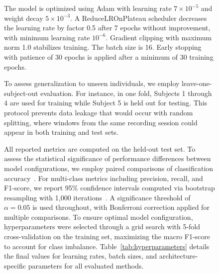 \documentclass[pdflatex,sn-vancouver-num, iicol]{sn-jnl}
\begin{document}
\begin{figure}[h]
The model is optimized using Adam with learning rate $7 \times 10^{-5}$ and weight decay $5 \times 10^{-3}$. A ReduceLROnPlateau scheduler decreases the learning rate by factor 0.5 after 7 epochs without improvement, with minimum learning rate $10^{-6}$. Gradient clipping with maximum norm 1.0 stabilizes training. The batch size is 16. Early stopping with patience of 30 epochs is applied after a minimum of 30 training epochs.


To assess generalization to unseen individuals, we employ leave-one-subject-out evaluation. For instance, in one fold, Subjects 1 through 4 are used for training while Subject 5 is held out for testing. This protocol prevents data leakage that would occur with random splitting, where windows from the same recording session could appear in both training and test sets.

All reported metrics are computed on the held-out test set. To assess the statistical significance of performance differences between model configurations, we employ paired comparisons of classification accuracy~\cite{demsar2006statistical}. For multi-class metrics including precision, recall, and F1-score, we report 95\% confidence intervals computed via bootstrap resampling with 1,000 iterations~\cite{lehmann2006testing}. A significance threshold of $\alpha = 0.05$ is used throughout, with Bonferroni correction applied for multiple comparisons. 
To ensure optimal model configuration, hyperparameters were selected through a grid search with 5-fold cross-validation on the training set, maximizing the macro F1-score to account for class imbalance.
Table~\ref{tab:hyperparameters} details the final values for learning rates, batch sizes, and architecture-specific parameters for all evaluated methods.



\end{figure}
\end{document}

